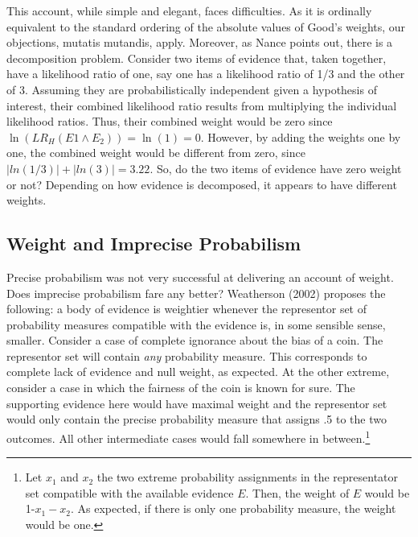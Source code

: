 \documentclass[
  10pt,
  dvipsnames,enabledeprecatedfontcommands]{scrartcl}
\begin{document}
This account, while simple and elegant, faces difficulties. As it is
ordinally equivalent to the standard ordering of the absolute values of
Good's weights, our objections, mutatis mutandis, apply. Moreover, as
Nance points out, there is a decomposition problem. Consider two items
of evidence that, taken together, have a likelihood ratio of one, say
one has a likelihood ratio of 1/3 and the other of 3. Assuming they are
probabilistically independent given a hypothesis of interest, their
combined likelihood ratio results from multiplying the individual
likelihood ratios. Thus, their combined weight would be zero since
\(\ln (LR_H(E1 \wedge E_2))=\ln (1) = 0\). However, by adding the
weights one by one, the combined weight would be different from zero,
since \(|ln(1/3)| + |ln(3)| = 3.22\). So, do the two items of evidence
have zero weight or not? Depending on how evidence is decomposed, it
appears to have different weights.


\hypertarget{weight-and-imprecise-probabilism}{%
\subsection{Weight and Imprecise
Probabilism}\label{weight-and-imprecise-probabilism}}

Precise probabilism was not very successful at delivering an account of
weight. Does imprecise probabilism fare any better? Weatherson (2002)
proposes the following: a body of evidence is weightier whenever the
representor set of probability measures compatible with the evidence is,
in some sensible sense, smaller.
 Consider a case of complete
ignorance about the bias of a coin. The representor set will contain
\emph{any} probability measure. This corresponds to complete lack of
evidence and null weight, as expected. At the other extreme, consider a
case in which the fairness of the coin is known for sure. The supporting
evidence here would have maximal weight and the representor set would
only contain the precise probability measure that assigns .5 to the two
outcomes. All other intermediate cases would fall somewhere in
between.\footnote{Let \(x_1\) and \(x_2\) the two extreme probability
  assignments in the representator set compatible with the available
  evidence \(E\). Then, the weight of \(E\) would be 1-\(x_1-x_2\). As
  expected, if there is only one probability measure, the weight would
  be one.}
\end{document}
